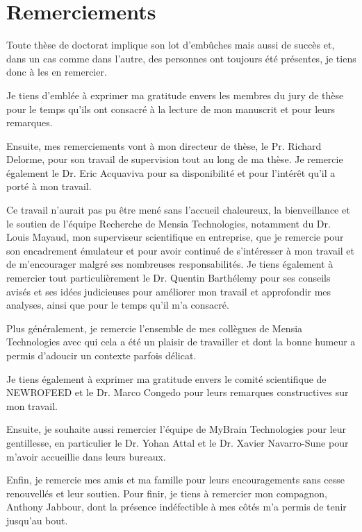 \chapter*{Remerciements}

Toute thèse de doctorat implique son lot d'embûches mais aussi de succès et, dans un cas comme dans l'autre, des personnes ont toujours 
été présentes, je tiens donc à les en remercier. 

Je tiens d'emblée à exprimer ma gratitude envers les membres du jury de thèse pour le temps qu'ils ont consacré à la lecture de mon manuscrit et pour leurs 
remarques.

Ensuite, mes remerciements vont à mon directeur de thèse, le Pr. Richard Delorme, pour son travail de supervision tout au long
de ma thèse. Je remercie également le Dr. Eric Acquaviva pour sa disponibilité et pour l'intérêt qu'il a porté à mon travail. 

Ce travail n'aurait pas pu être mené sans l'accueil chaleureux, la bienveillance et le soutien de l'équipe Recherche de Mensia Technologies, notamment  
du Dr. Louis Mayaud, mon superviseur scientifique en entreprise, que je remercie pour son encadrement émulateur et 
pour avoir continué de s'intéresser à mon travail et de m'encourager malgré ses nombreuses
responsabilités. Je tiens également à remercier tout particulièrement le Dr. Quentin Barthélemy pour ses conseils 
avisés et ses idées judicieuses pour améliorer mon travail et approfondir mes analyses, ainsi que pour le temps qu'il m'a consacré. 

Plus généralement, je remercie l'ensemble de mes collègues de Mensia Technologies avec qui cela a été un plaisir de travailler et dont la bonne 
humeur a permis d'adoucir un contexte parfois délicat.

Je tiens également à exprimer ma gratitude envers le comité scientifique de NEWROFEED et le Dr. Marco Congedo pour leurs remarques constructives sur mon travail. 

Ensuite, je souhaite aussi remercier l'équipe de MyBrain Technologies pour leur gentillesse, en particulier le Dr. Yohan Attal et le Dr. Xavier Navarro-Sune 
pour m'avoir accueillie dans leurs bureaux. 

Enfin, je remercie mes amis et ma famille pour leurs encouragements sans cesse renouvellés et leur soutien. Pour finir, je tiens à remercier 
mon compagnon, Anthony Jabbour, dont la présence indéfectible à mes côtés m'a permis de tenir jusqu'au bout.     